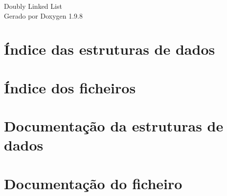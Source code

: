 \documentclass[twoside]{book}
\newcommand{\+}{\discretionary{\mbox{\scriptsize$\hookleftarrow$}}{}{}}
\newcommand{\clearemptydoublepage}{%
    \newpage{\pagestyle{empty}\cleardoublepage}%
  }
\begin{document}
  \raggedbottom
    \hypersetup{pageanchor=false,
                bookmarksnumbered=true,
                pdfencoding=unicode
               }
  \begin{titlepage}
  \vspace*{7cm}
  \begin{center}%
  {\Large Doubly Linked List}\\
  \vspace*{1cm}
  {\large Gerado por Doxygen 1.9.8}\\
  \end{center}
  \end{titlepage}
  \clearemptydoublepage
  \tableofcontents
  \clearemptydoublepage
  \hypersetup{pageanchor=true}

\chapter{Índice das estruturas de dados}

\chapter{Índice dos ficheiros}

\chapter{Documentação da estruturas de dados}


\chapter{Documentação do ficheiro}



  \backmatter
  \newpage
  \clearemptydoublepage
  \printindex
\end{document}
